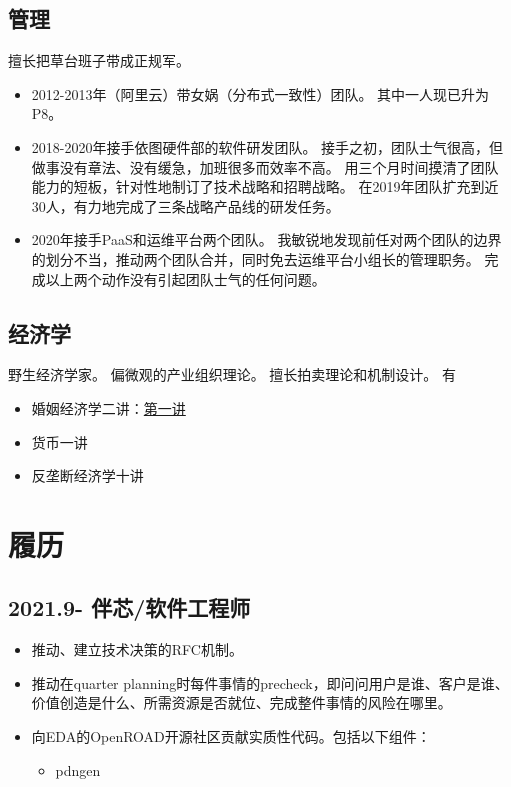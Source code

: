 \documentclass[scheme=plain]{ctexart}
\begin{document}
\subsection{管理}

擅长把草台班子带成正规军。
\begin{itemize}
    \item 2012-2013年（阿里云）带女娲（分布式一致性）团队。
        其中一人现已升为P8。
    \item 2018-2020年接手依图硬件部的软件研发团队。
        接手之初，团队士气很高，但做事没有章法、没有缓急，加班很多而效率不高。
        用三个月时间摸清了团队能力的短板，针对性地制订了技术战略和招聘战略。
        在2019年团队扩充到近30人，有力地完成了三条战略产品线的研发任务。
    \item 2020年接手PaaS和运维平台两个团队。
        我敏锐地发现前任对两个团队的边界的划分不当，推动两个团队合并，同时免去运维平台小组长的管理职务。
        完成以上两个动作没有引起团队士气的任何问题。
\end{itemize}

\subsection{经济学}

野生经济学家。
偏微观的产业组织理论。
擅长拍卖理论和机制设计。
有
\begin{itemize}
    \item 婚姻经济学二讲：\href{https://github.com/TimeExceed/sexsel/blob/master/sexsel.notes.pdf}{第一讲}
    \item 货币一讲
    \item 反垄断经济学十讲
\end{itemize}

\section{履历}

\subsection*{2021.9- 伴芯/软件工程师}

\begin{itemize}
    \item 推动、建立技术决策的RFC机制。
    \item 推动在quarter planning时每件事情的precheck，即问问用户是谁、客户是谁、价值创造是什么、所需资源是否就位、完成整件事情的风险在哪里。
    \item 向EDA的OpenROAD开源社区贡献实质性代码。包括以下组件：
        \begin{itemize}
            \item pdngen
        \end{itemize}
\end{itemize}
\end{document}
